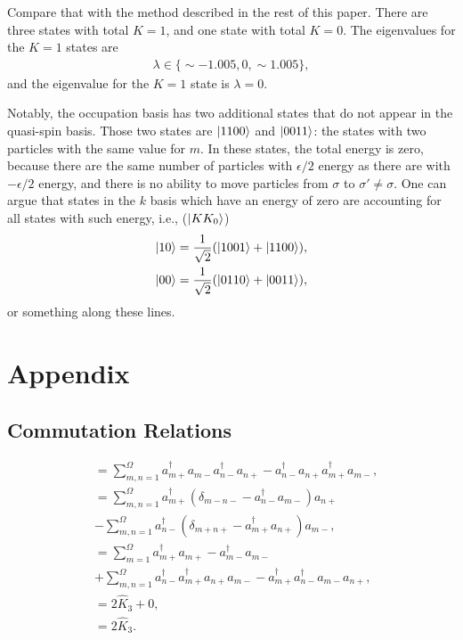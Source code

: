 \documentclass[
a4paper,
10pt,
twoside,
]{article}
\begin{document}
Compare that with the method described in the rest of this paper.
There are three states with total $K = 1$, and one state with total $K = 0$.
The eigenvalues for the $K=1$ states are
\begin{align}
	\lambda \in \{\sim -1.005,0,\sim 1.005\},
\end{align}
and the eigenvalue for the $K=1$ state is $\lambda = 0$.

Notably, the occupation basis has two additional states that do not appear in the quasi-spin basis.
Those two states are $\ket{1100}$ and $\ket{0011}$: the states with two particles with the same value for $m$.
In these states, the total energy is zero, because there are the same number of particles with $\epsilon/2$ energy as there are with $-\epsilon/2$ energy, and there is no ability to move particles from $\sigma$ to $\sigma' \neq \sigma$.
One can argue that states in the $k$ basis which have an energy of zero are accounting for all states with such energy, i.e., ($\ket{KK_0}$)
\begin{align}
	\ket{10} &= \frac{1}{\sqrt{2}} (\ket{1001}+\ket{1100}),\\
	\ket{00} &= \frac{1}{\sqrt{2}} (\ket{0110}+\ket{0011}),
\end{align}
or something along these lines.


\section{Appendix}\label{sec: appendix}

\subsection{Commutation Relations} \label{ssec: appendix commutation}


\begin{align}
	[\hat{K}_+,\hat{K}_-]
		&= \sum_{m,n=1}^\Omega a_{m+}^\dagger a_{m-} a_{n-}^\dagger a_{n+} - a_{n-}^\dagger a_{n+} a_{m+}^\dagger a_{m-},\\
		&= \sum_{m,n=1}^\Omega a_{m+}^\dagger (\delta_{m-n-} - a_{n-}^\dagger a_{m-}) a_{n+}\nonumber\\
		&- \sum_{m,n=1}^\Omega a_{n-}^\dagger (\delta_{m+n+} - a_{m+}^\dagger a_{n+}) a_{m-},\\
		&= \sum_{m=1}^\Omega a_{m+}^\dagger a_{m+} - a_{m-}^\dagger a_{m-}\nonumber\\
		&+ \sum_{m,n=1}^\Omega a_{n-}^\dagger a_{m+}^\dagger a_{n+} a_{m-} - a_{m+}^\dagger a_{n-}^\dagger a_{m-} a_{n+},\\
		&= 2\hat{K}_3 + 0,\\
		&= 2\hat{K}_3.
\end{align}
\end{document}
